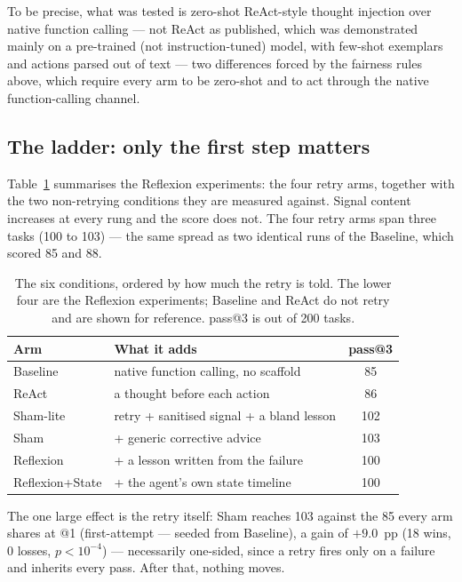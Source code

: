 \documentclass[a4paper, 12pt]{article}
\begin{document}
To be precise, what was tested is zero-shot ReAct-style thought injection over
native function calling --- not ReAct as published, which was demonstrated mainly
on a pre-trained (not instruction-tuned) model, with few-shot exemplars and actions
parsed out of text --- two differences forced by the fairness rules above,
which require every arm to be zero-shot and to act through the native function-calling channel.

\subsection{The ladder: only the first step matters}
\label{subsec:ladder}

Table~\ref{tab:arms} summarises the Reflexion experiments: the four retry arms,
together with the two non-retrying conditions they are measured against. Signal
content increases at every rung and the score does not. The four retry arms span
three tasks (100 to 103) --- the same spread as two identical runs of the
Baseline, which scored 85 and 88.

\begin{table}[t]
\centering\footnotesize
\caption{The six conditions, ordered by how much the retry is told. The lower
four are the Reflexion experiments; Baseline and ReAct do not retry and are
shown for reference. pass@3 is out of 200 tasks.}
\label{tab:arms}
\begin{tabular}{@{}llc@{}}
\toprule
\textbf{Arm} & \textbf{What it adds} & \textbf{pass@3} \\
\midrule
Baseline           & native function calling, no scaffold      & 85 \\
ReAct              & a thought before each action              & 86 \\
\midrule
Sham-lite          & retry + sanitised signal + a bland lesson & 102 \\
Sham               & \quad + generic corrective advice         & 103 \\
Reflexion          & \quad + a lesson written from the failure & 100 \\
Reflexion+State    & \quad + the agent's own state timeline    & 100 \\
\bottomrule
\end{tabular}
\end{table}
The one large effect is the retry itself: Sham reaches 103 against the 85
every arm shares at @1 (first-attempt --- seeded from Baseline), a gain of
$\mathbf{+9.0}$~pp (18 wins, 0 losses, $p<10^{-4}$) --- necessarily one-sided,
since a retry fires only on a failure and inherits every pass. After that,
nothing moves.
\end{document}
